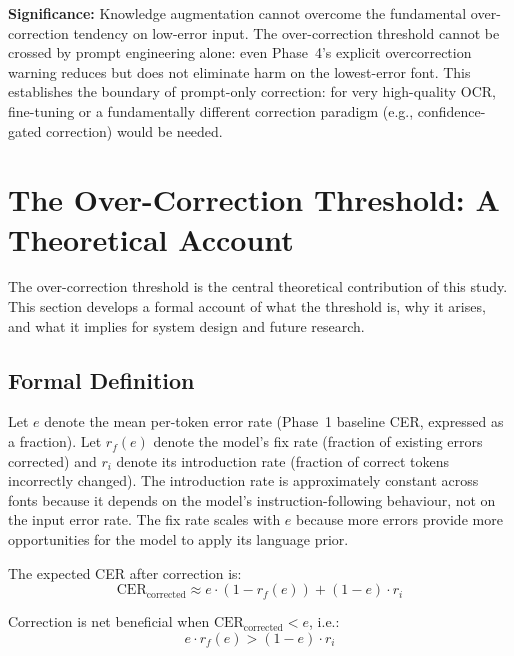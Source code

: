 \textbf{Significance:} Knowledge augmentation cannot overcome the fundamental
over-correction tendency on low-error input. The over-correction threshold
cannot be crossed by prompt engineering alone: even Phase~4's explicit
overcorrection warning reduces but does not eliminate harm on the lowest-error
font. This establishes the boundary of prompt-only correction: for very
high-quality OCR, fine-tuning or a fundamentally different correction
paradigm (e.g., confidence-gated correction) would be needed.

\section{The Over-Correction Threshold: A Theoretical Account}
\label{sec:disc_overcorrection}

The over-correction threshold is the central theoretical contribution of
this study. This section develops a formal account of what the threshold is,
why it arises, and what it implies for system design and future research.

\subsection{Formal Definition}
\label{subsec:disc_oc_formal}

Let $e$ denote the mean per-token error rate (Phase~1 baseline CER, expressed
as a fraction). Let $r_f(e)$ denote the model's fix rate (fraction of
existing errors corrected) and $r_i$ denote its introduction rate (fraction
of correct tokens incorrectly changed). The introduction rate is approximately
constant across fonts because it depends on the model's instruction-following
behaviour, not on the input error rate. The fix rate scales with $e$ because
more errors provide more opportunities for the model to apply its language
prior.

The expected CER after correction is:
\begin{equation}\label{eq:expected_cer}
  \text{CER}_{\text{corrected}} \approx e \cdot (1 - r_f(e)) + (1 - e) \cdot r_i
\end{equation}

Correction is net beneficial when $\text{CER}_{\text{corrected}} < e$, i.e.:
\begin{equation}\label{eq:threshold_condition}
  e \cdot r_f(e) > (1-e) \cdot r_i
\end{equation}

